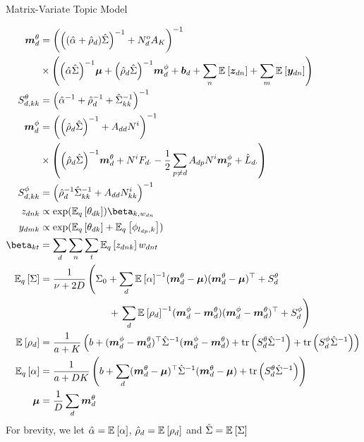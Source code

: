 \begin{algorithm}
\caption{Matrix-Variate Topic Model}
\label{alg:sra_generic}

    \begin{align*}
        \mtd &= 
            \invb{ \invb{(\hat{\alpha} + \hat{\rho}_d)\hat{\Sigma}} + N^o_d A_K } \\
            & \times \left(
                \invb{\hat{\alpha} \hat{\Sigma}}\vv{\mu}
                + \invb{\hat{\rho}_d \hat{\Sigma}} \mpd + \vv{b}_d 
                + \sum_n \ex{\vv{z}_{dn}}{} 
                + \sum_m \ex{\vv{y}_{dn}}{}
            \right)\\
         S^\theta_{d,kk} &= \invb{\inv{\hat{\alpha}} + \inv{\hat{\rho}_d} + \inv{\hat{\Sigma}}_{kk}} \\
         \mpd & = \invb{\invb{\hat{\rho}_d \hat{\Sigma}} + A_{dd}N^i} \\
             & \times \left(
                 \invb{\hat{\rho}_d \hat{\Sigma}}\mtd 
                 + N^i F_{d\cdot} 
                 -\half \sum_{p \neq d} A_{dp} N^i \vv{m}^\phi_p 
                 + \hat{L}_{d\cdot}
             \right) \\
        S^\phi_{d,kk} & = \invb{ \inv{\hat{\rho}_d} \inv{\hat{\Sigma}_{kk}} + A_{dd}N^i_{kk} } \\
        z_{dnk} & \propto \exp(\ex{\theta_{dk}}{q})\beta_{k,w_{dn}} \\
        y_{dmk} & \propto \exp(\ex{\theta_{dk}}{q} + \ex{\phi_{l_{dp},k}}{q}) \\
        \vv{\beta}_{kt} & = \sum_d \sum_n \sum_t \ex{z_{dnk}}{q} w_{dnt} \\
        \ex{\Sigma}{q} & =  \oneover{\nu + 2D} \left(\Sigma_0
             + \sum_d \inv{\ex{\alpha}{}} (\mtd - \vv{\mu})(\mtd - \vv{\mu})\T + \std  \right .\\
            & \qquad\qquad\qquad\quad+ \left. \sum_d \inv{\ex{\rho_d}{}} (\mpd - \mtd)(\mpd - \mtd)\T + \spd \right)  \\  \ex{\rho_d}{} & = \oneover{a + K} \left(b + (\mpd - \mtd)\T \inv{\hat{\Sigma}} (\mpd - \mtd) + \Tr{\std \inv{\hat{\Sigma}}} + \Tr{\spd \inv{\hat{\Sigma}}} \right) \\
        \ex{\alpha}{q} & = \oneover{a + DK} \left(b + \sum_d (\mtd - \vv{\mu})\T\inv{\hat{\Sigma}}(\mtd - \vv{\mu}) + \Tr{\std \inv{\hat{\Sigma}}} \right) \\
        \vv{\mu} &= \oneover{D} \sum_d \mtd
    \end{align*}
    For brevity, we let $\hat{\alpha} = \mathbb{E}_{ {  } }\left[ \alpha \right]$, $\hat{\rho}_d = \mathbb{E}_{ {  } }\left[ \rho_d \right]$ and $\hat{\Sigma} = \mathbb{E}_{ {  } }\left[ \Sigma \right]$
\end{algorithm}

